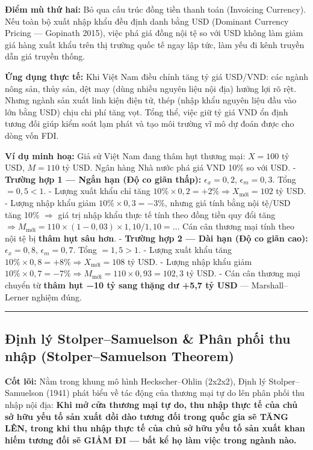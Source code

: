 \documentclass[
]{article}
\begin{document}
\textbf{Điểm mù thứ hai:} Bỏ qua cấu trúc đồng tiền thanh toán
(Invoicing Currency). Nếu toàn bộ xuất nhập khẩu đều định danh bằng USD
(Dominant Currency Pricing --- Gopinath 2015), việc phá giá đồng nội tệ
so với USD không làm giảm giá hàng xuất khẩu trên thị trường quốc tế
ngay lập tức, làm yếu đi kênh truyền dẫn giá truyền thống.

\textbf{Ứng dụng thực tế:} Khi Việt Nam điều chỉnh tăng tỷ giá USD/VND:
các ngành nông sản, thủy sản, dệt may (dùng nhiều nguyên liệu nội địa)
hưởng lợi rõ rệt. Nhưng ngành sản xuất linh kiện điện tử, thép (nhập
khẩu nguyên liệu đầu vào lớn bằng USD) chịu chi phí tăng vọt. Tổng thể,
việc giữ tỷ giá VND ổn định tương đối giúp kiểm soát lạm phát và tạo môi
trường vĩ mô dự đoán được cho dòng vốn FDI.

\textbf{Ví dụ minh hoạ:} Giả sử Việt Nam đang thâm hụt thương mại:
\(X = 100\) tỷ USD, \(M = 110\) tỷ USD. Ngân hàng Nhà nước phá giá VND
10\% so với USD. - \textbf{Trường hợp 1 --- Ngắn hạn (Độ co giãn thấp):}
\(\epsilon_x = 0{,}2\), \(\epsilon_m = 0{,}3\). Tổng \(= 0{,}5 < 1\). -
Lượng xuất khẩu chỉ tăng
\(10\% \times 0{,}2 = +2\% \Rightarrow X_{\text{mới}} = 102\) tỷ USD. -
Lượng nhập khẩu giảm \(10\% \times 0{,}3 = -3\%\), nhưng giá tính bằng
nội tệ/USD tăng 10\% \(\Rightarrow\) giá trị nhập khẩu thực tế tính theo
đồng tiền quy đổi tăng
\(\Rightarrow M_{\text{mới}} = 110 \times (1 - 0{,}03) \times 1{,}10 / 1{,}10 = \dots\)
Cán cân thương mại tính theo nội tệ bị \textbf{thâm hụt sâu hơn}. -
\textbf{Trường hợp 2 --- Dài hạn (Độ co giãn cao):}
\(\epsilon_x = 0{,}8\), \(\epsilon_m = 0{,}7\). Tổng \(= 1{,}5 > 1\). -
Lượng xuất khẩu tăng
\(10\% \times 0{,}8 = +8\% \Rightarrow X_{\text{mới}} = 108\) tỷ USD. -
Lượng nhập khẩu giảm
\(10\% \times 0{,}7 = -7\% \Rightarrow M_{\text{mới}} = 110 \times 0{,}93 = 102{,}3\)
tỷ USD. - Cán cân thương mại chuyển từ \textbf{thâm hụt −10 tỷ sang
thặng dư +5,7 tỷ USD} --- Marshall--Lerner nghiệm đúng.

\begin{center}\rule{0.5\linewidth}{0.5pt}\end{center}

\subsection{Định lý Stolper--Samuelson \& Phân phối thu nhập
(Stolper--Samuelson
Theorem)}\label{ux111ux1ecbnh-luxfd-stolpersamuelson-phuxe2n-phux1ed1i-thu-nhux1eadp-stolpersamuelson-theorem}

\textbf{Cốt lõi:} Nằm trong khung mô hình Heckscher--Ohlin (2x2x2), Định
lý Stolper--Samuelson (1941) phát biểu về tác động của thương mại tự do
lên phân phối thu nhập nội địa: \textbf{Khi mở cửa thương mại tự do, thu
nhập thực tế của chủ sở hữu yếu tố sản xuất dồi dào tương đối trong quốc
gia sẽ TĂNG LÊN, trong khi thu nhập thực tế của chủ sở hữu yếu tố sản
xuất khan hiếm tương đối sẽ GIẢM ĐI --- bất kể họ làm việc trong ngành
nào.}
\end{document}
